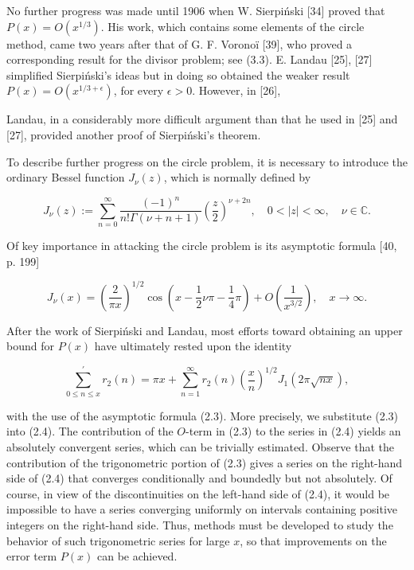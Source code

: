 \documentclass[10pt]{article}
\theoremstyle{plain}
\begin{document}
No further progress was made until 1906 when W. Sierpiński [34] proved that $P(x)=O\left(x^{1 / 3}\right)$. His work, which contains some elements of the circle method, came two years after that of G. F. Voronoï [39], who proved a corresponding result for the divisor problem; see (3.3). E. Landau [25], [27] simplified Sierpiński's ideas but in doing so obtained the weaker result $P(x)=O\left(x^{1 / 3+\epsilon}\right)$, for every $\epsilon>0$. However, in [26],

Landau, in a considerably more difficult argument than that he used in [25] and [27], provided another proof of Sierpiński's theorem.

To describe further progress on the circle problem, it is necessary to introduce the ordinary Bessel function $J_{\nu}(z)$, which is normally defined by


\begin{equation*}
J_{\nu}(z):=\sum_{n=0}^{\infty} \frac{(-1)^{n}}{n!\Gamma(\nu+n+1)}\left(\frac{z}{2}\right)^{\nu+2n}, \quad 0<|z|<\infty, \quad \nu \in \mathbb{C} . \tag{2.2}
\end{equation*}


Of key importance in attacking the circle problem is its asymptotic formula [40, p. 199]


\begin{equation*}
J_{\nu}(x)=\left(\frac{2}{\pi x}\right)^{1 / 2} \cos \left(x-\frac{1}{2} \nu\pi-\frac{1}{4} \pi\right)+O\left(\frac{1}{x^{3 / 2}}\right), \quad x \to \infty . \tag{2.3}
\end{equation*}


After the work of Sierpiński and Landau, most efforts toward obtaining an upper bound for $P(x)$ have ultimately rested upon the identity


\begin{equation*}
\sum_{0 \leq n \leq x}^{\prime} r_{2}(n)=\pi x+\sum_{n=1}^{\infty} r_{2}(n)\left(\frac{x}{n}\right)^{1 / 2} J_{1}(2 \pi \sqrt{n x}), \tag{2.4}
\end{equation*}


with the use of the asymptotic formula (2.3). More precisely, we substitute (2.3) into (2.4). The contribution of the $O$-term in (2.3) to the series in (2.4) yields an absolutely convergent series, which can be trivially estimated. Observe that the contribution of the trigonometric portion of (2.3) gives a series on the right-hand side of (2.4) that converges conditionally and boundedly but not absolutely. Of course, in view of the discontinuities on the left-hand side of (2.4), it would be impossible to have a series converging uniformly on intervals containing positive integers on the right-hand side. Thus, methods must be developed to study the behavior of such trigonometric series for large $x$, so that improvements on the error term $P(x)$ can be achieved.
\end{document}
